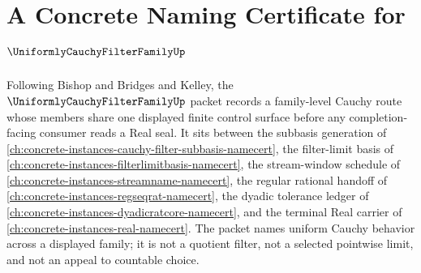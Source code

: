 \chapter{A Concrete Naming Certificate for $\UniformlyCauchyFilterFamilyUp$}
\label{ch:concrete-instances-uniformly-cauchy-filter-family-namecert}

Following Bishop and Bridges and Kelley, the $\UniformlyCauchyFilterFamilyUp$ packet records a family-level Cauchy route whose members share one displayed finite control surface before any completion-facing consumer reads a Real seal. It sits between the subbasis generation of \autoref{ch:concrete-instances-cauchy-filter-subbasis-namecert}, the filter-limit basis of \autoref{ch:concrete-instances-filterlimitbasis-namecert}, the stream-window schedule of \autoref{ch:concrete-instances-streamname-namecert}, the regular rational handoff of \autoref{ch:concrete-instances-regseqrat-namecert}, the dyadic tolerance ledger of \autoref{ch:concrete-instances-dyadicratcore-namecert}, and the terminal Real carrier of \autoref{ch:concrete-instances-real-namecert}. The packet names uniform Cauchy behavior across a displayed family; it is not a quotient filter, not a selected pointwise limit, and not an appeal to countable choice.

